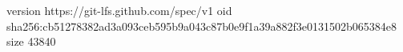 version https://git-lfs.github.com/spec/v1
oid sha256:cb51278382ad3a093ceb595b9a043c87b0e9f1a39a882f3e0131502b065384e8
size 43840
